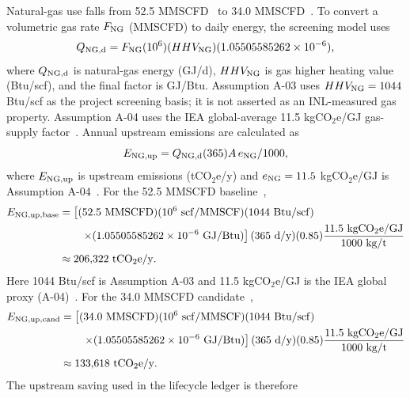 Natural-gas use falls from 52.5 MMSCFD~\cite{inltev953} to 34.0 MMSCFD~\cite{inltev961}. To convert a volumetric gas rate $F_{\rm NG}$ (MMSCFD) to daily energy, the screening model uses
\begin{equation}\label{eq:ng-energy}
Q_{\rm NG,d}=F_{\rm NG}(10^6)(HHV_{\rm NG})(1.05505585262\times10^{-6}),
\end{equation}
where $Q_{\rm NG,d}$ is natural-gas energy (GJ/d), $HHV_{\rm NG}$ is gas higher heating value (Btu/scf), and the final factor is GJ/Btu. Assumption A-03 uses $HHV_{\rm NG}=1044$ Btu/scf as the project screening basis; it is not asserted as an INL-measured gas property. Assumption A-04 uses the IEA global-average 11.5 kgCO$_2$e/GJ gas-supply factor~\cite{iea2026lng}. Annual upstream emissions are calculated as
\begin{equation}\label{eq:upstream-ng}
E_{\rm NG,up}=Q_{\rm NG,d}(365)A\,e_{\rm NG}/1000,
\end{equation}
where $E_{\rm NG,up}$ is upstream emissions (tCO$_2$e/y) and $e_{\rm NG}=11.5$ kgCO$_2$e/GJ is Assumption A-04~\cite{iea2026lng}. For the 52.5 MMSCFD baseline~\cite{inltev953},
\begin{equation}\label{eq:upstream-ng-base}
\begin{aligned}
E_{\rm NG,up,base}
&=\left[(52.5~\mathrm{MMSCFD})(10^6~\mathrm{scf/MMSCF})(1044~\mathrm{Btu/scf})\right.\\
&\qquad\left.\times(1.05505585262\times10^{-6}~\mathrm{GJ/Btu})\right]
(365~\mathrm{d/y})(0.85)
\frac{11.5~\mathrm{kgCO_2e/GJ}}{1000~\mathrm{kg/t}}\\
&\approx206{,}322~\mathrm{tCO_2e/y}.
\end{aligned}
\end{equation}
Here 1044 Btu/scf is Assumption A-03 and 11.5 kgCO$_2$e/GJ is the IEA global proxy (A-04)~\cite{iea2026lng}. For the 34.0 MMSCFD candidate~\cite{inltev961},
\begin{equation}\label{eq:upstream-ng-candidate}
\begin{aligned}
E_{\rm NG,up,cand}
&=\left[(34.0~\mathrm{MMSCFD})(10^6~\mathrm{scf/MMSCF})(1044~\mathrm{Btu/scf})\right.\\
&\qquad\left.\times(1.05505585262\times10^{-6}~\mathrm{GJ/Btu})\right]
(365~\mathrm{d/y})(0.85)
\frac{11.5~\mathrm{kgCO_2e/GJ}}{1000~\mathrm{kg/t}}\\
&\approx133{,}618~\mathrm{tCO_2e/y}.
\end{aligned}
\end{equation}
The upstream saving used in the lifecycle ledger is therefore
